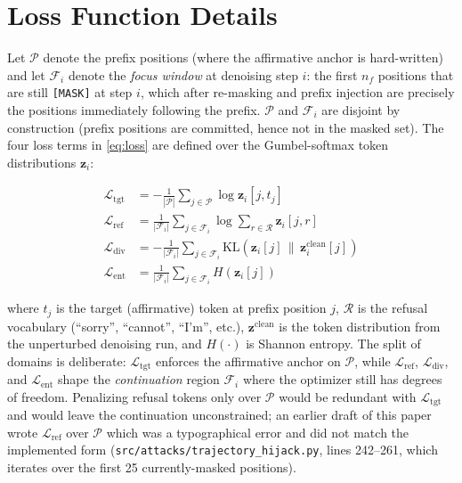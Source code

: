 \documentclass{article}
\theoremstyle{coloredthm}
\newcommand{\maskid}{\texttt{[MASK]}}
\begin{document}
\section{Loss Function Details}
\label{sec:lossdetails}

Let $\mathcal{P}$ denote the prefix positions (where the affirmative anchor is hard-written) and let $\mathcal{F}_i$ denote the \emph{focus window} at denoising step $i$: the first $n_f$ positions that are still \maskid{} at step $i$, which after re-masking and prefix injection are precisely the positions immediately following the prefix. $\mathcal{P}$ and $\mathcal{F}_i$ are disjoint by construction (prefix positions are committed, hence not in the masked set). The four loss terms in \cref{eq:loss} are defined over the Gumbel-softmax token distributions $\mathbf{z}_i$:

\begin{align}
\mathcal{L}_{\text{tgt}} &= -\frac{1}{|\mathcal{P}|}\sum_{j \in \mathcal{P}} \log \mathbf{z}_{i}[j, t_j] \label{eq:ltgt} \\
\mathcal{L}_{\text{ref}} &= \frac{1}{|\mathcal{F}_i|}\sum_{j \in \mathcal{F}_i} \log \sum_{r \in \mathcal{R}} \mathbf{z}_{i}[j, r] \label{eq:lref} \\
\mathcal{L}_{\text{div}} &= -\frac{1}{|\mathcal{F}_i|} \sum_{j \in \mathcal{F}_i} \text{KL}\!\left(\mathbf{z}_{i}[j] \,\|\, \mathbf{z}^{\text{clean}}_{i}[j]\right) \label{eq:ldiv} \\
\mathcal{L}_{\text{ent}} &= \frac{1}{|\mathcal{F}_i|} \sum_{j \in \mathcal{F}_i} H(\mathbf{z}_{i}[j]) \label{eq:lent}
\end{align}

where $t_j$ is the target (affirmative) token at prefix position $j$, $\mathcal{R}$ is the refusal vocabulary (``sorry'', ``cannot'', ``I'm'', etc.), $\mathbf{z}^{\text{clean}}$ is the token distribution from the unperturbed denoising run, and $H(\cdot)$ is Shannon entropy. The split of domains is deliberate: $\mathcal{L}_{\text{tgt}}$ enforces the affirmative anchor on $\mathcal{P}$, while $\mathcal{L}_{\text{ref}}$, $\mathcal{L}_{\text{div}}$, and $\mathcal{L}_{\text{ent}}$ shape the \emph{continuation} region $\mathcal{F}_i$ where the optimizer still has degrees of freedom. Penalizing refusal tokens only over $\mathcal{P}$ would be redundant with $\mathcal{L}_{\text{tgt}}$ and would leave the continuation unconstrained; an earlier draft of this paper wrote $\mathcal{L}_{\text{ref}}$ over $\mathcal{P}$ which was a typographical error and did not match the implemented form (\texttt{src/attacks/trajectory\_hijack.py}, lines 242--261, which iterates over the first 25 currently-masked positions).
\end{document}
